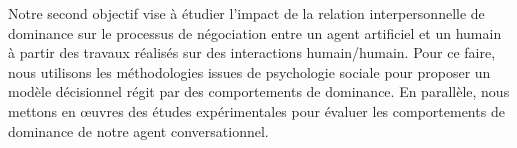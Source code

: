 Notre second objectif vise à étudier l'impact de la relation interpersonnelle de dominance sur le processus de négociation entre un agent artificiel et un humain à partir des travaux réalisés sur des interactions humain/humain.
Pour ce faire, nous utilisons les méthodologies issues de psychologie sociale pour proposer un modèle décisionnel régit par des comportements de dominance. En parallèle, nous mettons en œuvres des études expérimentales pour évaluer les comportements de dominance de notre agent conversationnel.  


%
%
%
%
%	
%	
%
%
%	 
%
